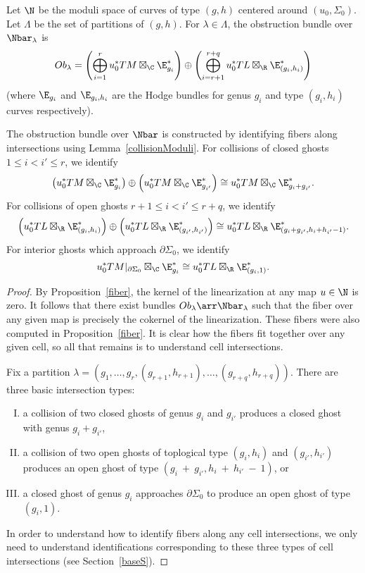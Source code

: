 \begin{proposition} \label{ob}
Let $\N$ be the moduli space of curves of type $(g,h)$ centered around $(u_0,\Sigma_0)$. Let $\Lambda$ be the set of partitions of $(g,h)$. For $\lambda \in \Lambda$, the obstruction bundle over $\Nbar_\lambda$ is
\[
Ob_\lambda = \left( \bigoplus\limits_{i=1}^r u_0^*TM \boxtimes_\C \E_{g_i}^* \right) \oplus \left( \bigoplus\limits_{i=r+1}^{r+q} u_0^*TL \boxtimes_\R \E_{(g_i,h_i)}^* \right)
\]
(where $\E_{g_i}$ and $\E_{g_i,h_i}$ are the Hodge bundles for genus $g_i$ and type $(g_i,h_i)$ curves respectively).

The obstruction bundle over $\Nbar$ is constructed by identifying fibers along intersections using Lemma~\ref{collisionModuli}. 
For collisions of closed ghosts $1 \leq i<i' \leq r$, we identify
\[
\left( u_0^*TM \boxtimes_\C \E_{g_i}^* \right) \oplus \left( u_0^*TM \boxtimes_\C \E_{g_{i'}}^* \right) \cong u_0^*TM \boxtimes_\C \E_{g_i+g_{i'}}^*.
\]
For collisions of open ghosts $r+1 \leq i<i' \leq r+q$, we identify 
\[
\left( u_0^*TL \boxtimes_\R \E_{(g_i,h_i)}^* \right) \oplus \left( u_0^*TL \boxtimes_\R \E_{(g_{i'},h_{i'})}^* \right) \cong u_0^*TL \boxtimes_\R \E_{(g_i+g_{i'},h_i+h_{i'}-1)}^*.
\]
For interior ghosts which approach $\partial\Sigma_0$, we identify
\[
u_0^*TM|_{\partial\Sigma_0} \boxtimes_\C \E_{g_i}^* \cong u_0^*TL \boxtimes_\R \E_{(g_i,1)}^*.
\]
\begin{proof}
By Proposition~\ref{fiber}, the kernel of the linearization at any map $u \in \N$ is zero. It follows that there exist bundles $Ob_\lambda \arr \Nbar_\lambda$ such that the fiber over any given map is precisely the cokernel of the linearization. These fibers were also computed in Proposition~\ref{fiber}. It is clear how the fibers fit together over any given cell, so all that remains is to understand cell intersections.

Fix a partition $\lambda=(g_1,\ldots,g_r,(g_{r+1},h_{r+1}),\ldots,(g_{r+q},h_{r+q}))$. 
There are three basic intersection types:
\begin{enumerate}[(I)]
\item a collision of two closed ghosts of genus $g_i$ and $g_{i'}$ produces a closed ghost with genus $g_i+g_{i'}$,
\item a collision of two open ghosts of toplogical type $(g_i,h_i)$ and $(g_{i'},h_{i'})$ produces an open ghost of type $(g_i~+~g_{i'}, h_i~+~h_{i'}~-~1)$, or
\item a closed ghost of genus $g_i$ approaches $\partial\Sigma_0$ to produce an open ghost of type $(g_i,1)$.
\end{enumerate}
In order to understand how to identify fibers along any cell intersections, we only need to understand identifications corresponding to these three types of cell intersections (see Section~\ref{baseS}).


\end{proof}
\end{proposition}
